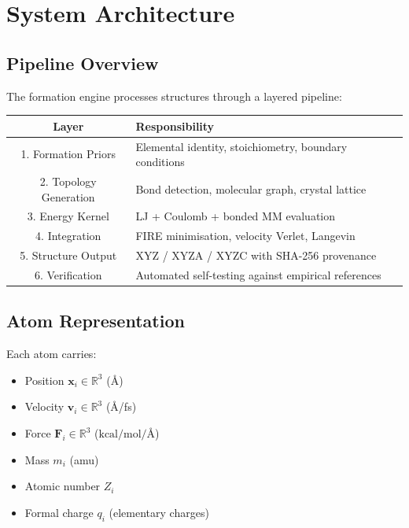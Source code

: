\documentclass[11pt,twoside]{article}
\newcommand{\Angstrom}{\text{\AA}}
\newcommand{\kcalmol}{\text{kcal/mol}}
\begin{document}
\section{System Architecture}
\label{sec:architecture}

\subsection{Pipeline Overview}

The formation engine processes structures through a layered pipeline:

\begin{center}
\begin{tabular}{cl}
\toprule
\textbf{Layer} & \textbf{Responsibility} \\
\midrule
1. Formation Priors    & Elemental identity, stoichiometry, boundary conditions \\
2. Topology Generation & Bond detection, molecular graph, crystal lattice \\
3. Energy Kernel       & LJ + Coulomb + bonded MM evaluation \\
4. Integration         & FIRE minimisation, velocity Verlet, Langevin \\
5. Structure Output    & XYZ / XYZA / XYZC with SHA-256 provenance \\
6. Verification        & Automated self-testing against empirical references \\
\bottomrule
\end{tabular}
\end{center}

\subsection{Atom Representation}

Each atom carries:
\begin{itemize}
  \item Position $\mathbf{x}_i \in \mathbb{R}^3$ (\AA)
  \item Velocity $\mathbf{v}_i \in \mathbb{R}^3$ (\AA/fs)
  \item Force $\mathbf{F}_i \in \mathbb{R}^3$ ($\kcalmol/\Angstrom$)
  \item Mass $m_i$ (amu)
  \item Atomic number $Z_i$
  \item Formal charge $q_i$ (elementary charges)
\end{itemize}
\end{document}
